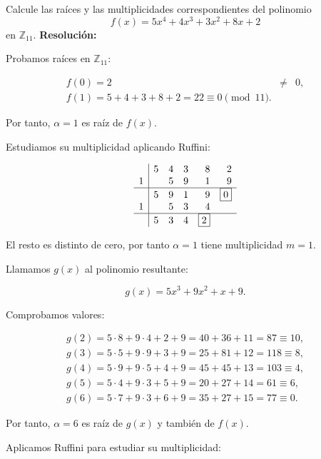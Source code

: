 \documentclass[a4paper,12pt]{article}
\begin{document}
\begin{ejercicio}[title=Ejercicio 46]
Calcule las raíces y las multiplicidades correspondientes del polinomio
\[
f(x) = 5x^4 + 4x^3 + 3x^2 + 8x + 2
\]
en $\mathbb{Z}_{11}$.
\tcblower
\textbf{Resolución:}

Probamos raíces en $\mathbb{Z}_{11}$:

\[
\begin{array}{lcl}
f(0) = 2 &\neq& 0, \\
f(1) = 5 + 4 + 3 + 8 + 2 = 22 \equiv 0 \pmod{11}.
\end{array}
\]

Por tanto, $\alpha = 1$ es raíz de $f(x)$.

\vspace{0.5em}
Estudiamos su multiplicidad aplicando Ruffini:

\[
\begin{array}{r|rrrrr}
  & 5 & 4 & 3 & 8 & 2 \\
1 &   & 5 & 9 & 1 & 9 \\
\hline
  & 5 & 9 & 1 & 9 & \boxed{0} \\
1 &   & 5 & 3 & 4 \\
\hline
  & 5 & 3 & 4 & \boxed{2}
\end{array}
\]

El resto es distinto de cero, por tanto \(\alpha = 1\) tiene multiplicidad \(m = 1\).

\vspace{0.5em}
Llamamos $g(x)$ al polinomio resultante:

\[
g(x) = 5x^3 + 9x^2 + x + 9.
\]

Comprobamos valores:

\[
\begin{array}{lcl}
g(2) = 5\cdot8 + 9\cdot4 + 2 + 9 = 40 + 36 + 11 = 87 \equiv 10, \\
g(3) = 5\cdot5 + 9\cdot9 + 3 + 9 = 25 + 81 + 12 = 118 \equiv 8, \\
g(4) = 5\cdot9 + 9\cdot5 + 4 + 9 = 45 + 45 + 13 = 103 \equiv 4, \\
g(5) = 5\cdot4 + 9\cdot3 + 5 + 9 = 20 + 27 + 14 = 61 \equiv 6, \\
g(6) = 5\cdot7 + 9\cdot3 + 6 + 9 = 35 + 27 + 15 = 77 \equiv 0.
\end{array}
\]

Por tanto, \(\alpha = 6\) es raíz de \(g(x)\) y también de \(f(x)\).

\vspace{0.5em}
Aplicamos Ruffini para estudiar su multiplicidad:


\end{ejercicio}
\end{document}
